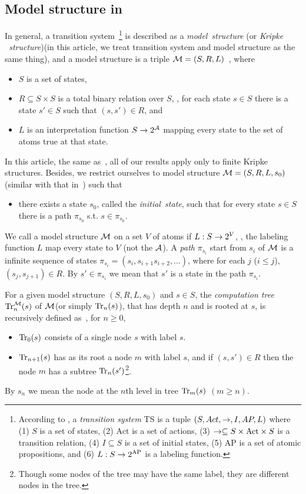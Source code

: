 \documentclass{article}
\begin{document}
\subsection{Model structure in \CTL}
 In general, a transition system~\footnote{According to \cite{Baier:PMC:2008},
a {\em transition system} TS is a tuple $(S, Act,\rightarrow,I, AP, L)$ where
(1) $S$ is a set of states,
(2) $\textrm{Act}$ is a set of actions,
(3) $\rightarrow\subseteq S\times \textrm{Act}\times S$ is a transition relation,
(4) $I\subseteq S$ is a set of initial states,
(5) $\textrm{AP}$ is a set of atomic propositions, and
(6) $L:S\rightarrow 2^{\textrm{AP}}$ is a labeling function.} is described as a \emph{model\ structure} (or \emph{Kripke \ structure})(in this article, we treat transition system and model structure as the same thing), and a model structure is a triple ${\cal M}=(S,R,L)$~\cite{emerson1990temporal}, where
\begin{itemize}
  \item $S$ is a set of states,
  \item $R\subseteq S\times S$ is a total binary relation over $S$, \ie, for each state $s\in S$ there is a state $s'\in S$ such that $(s,s')\in R$, and
  \item $L$ is an interpretation function $S\rightarrow 2^{\cal A}$ mapping every state to the set of atoms true at that state.
\end{itemize}
In this article, the same as~\cite{DBLP:journals/tcs/BrowneCG88}, all of our results apply only to finite Kripke structures.
Besides, we restrict ourselves to model structure ${\cal M}=(S,R,L,s_0)$ (similar with that in~\cite{zhang2009refined}) such that
\begin{itemize}
  \item there exists a state $s_0$, called the \emph{initial\ state}, such that for every state $s\in S$ there is a path $\pi_{s_0}$ s.t. $s\in \pi_{s_0}$.
\end{itemize}
We call a model structure ${\cal M}$ on a set $V$ of atoms if $L: S \rightarrow 2^V$, \ie, the labeling function $L$ map every state to $V$ (not the ${\cal A}$).  A \emph{path} $\pi_{s_i}$ start from $s_i$ of ${\cal M}$ is a infinite sequence of states $\pi_{s_i}=(s_i, s_{i+1} s_{i+2},\dots)$, where for each $j$ ($i\leq j$), $(s_j, s_{j+1}) \in R$. By $s'\in \pi_{s_i}$ we mean that $s'$ is a state in the path $\pi_{s_i}$.

For a given model structure $(S,R,L,s_0)$ and $s\in S$,
the {\em computation tree}
$\textrm{Tr}_n^{\cal M}(s)$ of $\cal M$(or simply $\textrm{Tr}_n(s)$), that has depth $n$ and is rooted at $s$, is recursively defined as~\cite{DBLP:journals/tcs/BrowneCG88}, for $n\ge 0$,
\begin{itemize}
  \item $\textrm{Tr}_0(s)$ consists of a single node $s$ with label $s$.
  \item $\textrm{Tr}_{n+1}(s)$ has as its root a node $m$ with label  $s$, and
  if $(s,s')\in R$ then the node $m$ has a subtree $\textrm{Tr}_n(s')$\footnote{Though
  some nodes of the tree may have the same label, they are different nodes in the tree.}.
\end{itemize}
By $s_n$ we mean the node at the $n$th level in tree $\textrm{Tr}_m(s)$ $(m \geq n)$.
\end{document}
